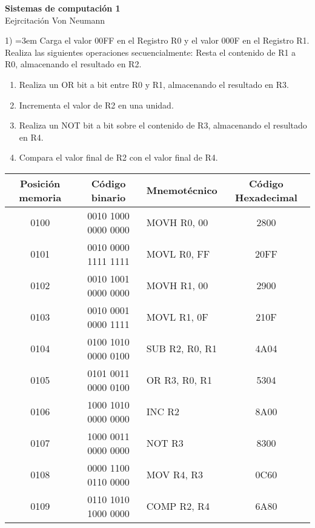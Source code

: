 \documentclass[a4paper,12pt]{article}
\begin{document}
	
	\begin{center}
		
		\LARGE \textbf{Sistemas de computación 1} \\[0.5cm]
		\LARGE Eejrcitación Von Neumann \\
	\end{center}
	
	1) \hangindent=3em Carga el valor 00FF en el Registro R0 y el valor 000F en el Registro R1. Realiza las siguientes operaciones secuencialmente:
	Resta el contenido de R1 a R0, almacenando el resultado en R2.
	\begin{enumerate}
		\item Realiza un OR bit a bit entre R0 y R1, almacenando el resultado en R3.
		\item Incrementa el valor de R2 en una unidad.
		\item Realiza un NOT bit a bit sobre el contenido de R3, almacenando el resultado en R4.
		\item Compara el valor final de R2 con el valor final de R4.
	\end{enumerate}
	
	\vspace{0.5cm}
	
	\begin{tabular}{c|c|l|c}
	\textbf{Posición memoria} & \textbf{Código binario} & \textbf{Mnemotécnico} & \textbf{Código Hexadecimal}\\
	\hline
	0100 & 0010 1000 0000 0000 & MOVH R0, 00 & 2800 \\
	0101 & 0010 0000 1111 1111 & MOVL R0, FF & 20FF \\
	0102 & 0010 1001 0000 0000 & MOVH R1, 00 & 2900 \\
	0103 & 0010 0001 0000 1111 & MOVL R1, 0F & 210F \\
	0104 & 0100 1010 0000 0100 & SUB R2, R0, R1 & 4A04 \\
	0105 & 0101 0011 0000 0100 & OR R3, R0, R1 & 5304 \\
	0106 & 1000 1010 0000 0000 & INC R2 & 8A00 \\
	0107 & 1000 0011 0000 0000 & NOT R3 & 8300 \\
	0108 & 0000 1100 0110 0000 & MOV R4, R3 & 0C60 \\
	0109 & 0110 1010 1000 0000 & COMP R2, R4 & 6A80 \\
	\end{tabular}	
	
	\vspace{2cm}
	
\end{document}
